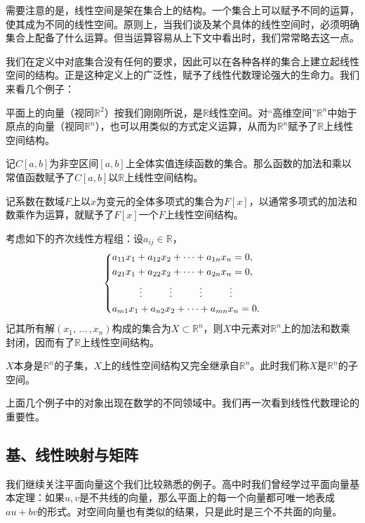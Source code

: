 需要注意的是，线性空间是架在集合上的结构。一个集合上可以赋予不同的运算，使其成为不同的线性空间。原则上，当我们谈及某个具体的线性空间时，必须明确集合上配备了什么运算。但当运算容易从上下文中看出时，我们常常略去这一点。

我们在定义中对底集合没有任何的要求，因此可以在各种各样的集合上建立起线性空间的结构。正是这种定义上的广泛性，赋予了线性代数理论强大的生命力。我们来看几个例子：

平面上的向量（视同$\mathbb{R}^2$）按我们刚刚所说，是$\mathbb{R}$线性空间。对“高维空间”$\mathbb{R}^n$中始于原点的向量（视同$\mathbb{R}^n$），也可以用类似的方式定义运算，从而为$\mathbb{R}^n$赋予了$\mathbb{R}$上线性空间结构。

记$C[a,b]$为非空区间$[a,b]$上全体实值连续函数的集合。那么函数的加法和乘以常值函数赋予了$C[a,b]$以$\mathbb{R}$上线性空间结构。

记系数在数域$F$上以$x$为变元的全体多项式的集合为$F[x]$，以通常多项式的加法和数乘作为运算，就赋予了$F[x]$一个$F$上线性空间结构。

考虑如下的齐次线性方程组：设$a_{ij}\in\mathbb{R}$，
\[
    \begin{dcases}
        a_{11}x_1+a_{12}x_2+\cdots+a_{1n}x_n=0,                               \\
        a_{21}x_1+a_{22}x_2+\cdots+a_{2n}x_n=0,                               \\
        \mbox{}\hfill\vdots\hfill\vdots \hfill\vdots\hfill\vdots\hfill\mbox{} \\
        a_{m1}x_1+a_{n2}x_2+\cdots +a_{mn}x_n=0.
    \end{dcases}
\]
记其所有解$(x_1,\,\dots\,,x_n)$构成的集合为$X\subset \mathbb{R}^n$，则$X$中元素对$\mathbb{R}^n$上的加法和数乘封闭，因而有了$\mathbb{R}$上线性空间结构。

$X$本身是$\mathbb{R}^n$的子集，$X$上的线性空间结构又完全继承自$\mathbb{R}^n$。此时我们称$X$是$\mathbb{R}^n$的子空间。

上面几个例子中的对象出现在数学的不同领域中。我们再一次看到线性代数理论的重要性。

\subsection{基、线性映射与矩阵}
我们继续关注平面向量这个我们比较熟悉的例子。高中时我们曾经学过平面向量基本定理：如果$u,v$是不共线的向量，那么平面上的每一个向量都可唯一地表成$au+bv$的形式。对空间向量也有类似的结果，只是此时是三个不共面的向量。

\begin{center}
\end{center}

